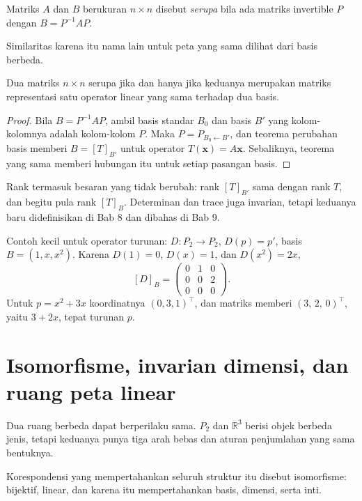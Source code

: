 \begin{definisi}
Matriks $A$ dan $B$ berukuran $n\times n$ disebut \emph{serupa} bila ada matriks invertible
$P$ dengan $B=P^{-1}AP$.
\end{definisi}

Similaritas karena itu nama lain untuk peta yang sama dilihat dari basis berbeda.

\begin{proposisi}
Dua matriks $n\times n$ serupa jika dan hanya jika keduanya merupakan matriks representasi
satu operator linear yang sama terhadap dua basis.
\end{proposisi}

\begin{proof}
Bila $B=P^{-1}AP$, ambil basis standar $B_{0}$ dan basis $B'$ yang kolom-kolomnya adalah
kolom-kolom $P$. Maka $P=P_{B_{0}\leftarrow B'}$, dan teorema perubahan basis memberi
$B=[T]_{B'}$ untuk operator $T(\mathbf{x})=A\mathbf{x}$. Sebaliknya, teorema yang sama
memberi
hubungan itu untuk setiap pasangan basis.
\end{proof}

Rank termasuk besaran yang tidak berubah: rank $[T]_{B'}$ sama dengan rank $T$, dan
begitu pula rank $[T]_{B}$. Determinan dan trace juga invarian, tetapi keduanya baru
didefinisikan di Bab 8 dan dibahas di Bab 9.

Contoh kecil untuk operator turunan: $D\colon P_{2}\to P_{2}$, $D(p)=p'$, basis
$B=(1,x,x^{2})$. Karena $D(1)=0$, $D(x)=1$, dan $D(x^{2})=2x$,
\[
  [D]_{B}=\begin{pmatrix}0&1&0\\ 0&0&2\\ 0&0&0\end{pmatrix}.
\]
Untuk $p=x^{2}+3x$ koordinatnya $(0,3,1)^{\top}$, dan matriks memberi $(3,\,2,\,0)^{\top}$,
yaitu $3+2x$, tepat turunan $p$.

\section{Isomorfisme, invarian dimensi, dan ruang peta linear}

Dua ruang berbeda dapat berperilaku sama. $P_{2}$ dan $\mathbb{R}^{3}$ berisi objek
berbeda jenis, tetapi keduanya punya tiga arah bebas dan aturan penjumlahan yang sama
bentuknya.

Korespondensi yang mempertahankan seluruh struktur itu disebut isomorfisme: bijektif,
linear, dan karena itu mempertahankan basis, dimensi, serta inti.

